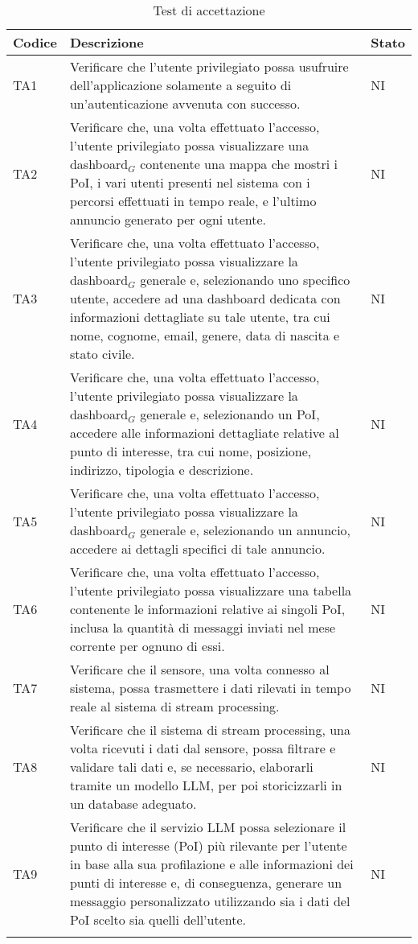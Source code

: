 \documentclass[10pt]{article}
\begin{document}
\begin{justify}
\begin{longtable}{|>{\centering\arraybackslash}m{2cm}|>{\centering\arraybackslash}m{7cm}|>{\centering\arraybackslash}m{2cm}|}
\hline
\textbf{Codice} & \textbf{Descrizione} & \textbf{Stato}\\
\endhead
\hline
TA1 & Verificare che l'utente privilegiato possa usufruire dell'applicazione solamente a seguito di un'autenticazione avvenuta con successo. & NI \\
\hline
TA2 & Verificare che, una volta effettuato l'accesso, l'utente privilegiato possa visualizzare una dashboard$_G$ contenente una mappa che mostri i PoI, i vari utenti presenti nel sistema con i percorsi effettuati in tempo reale, e l'ultimo annuncio generato per ogni utente. & NI \\
\hline
TA3 & Verificare che, una volta effettuato l'accesso, l'utente privilegiato possa visualizzare la dashboard$_G$ generale e, selezionando uno specifico utente, accedere ad una dashboard dedicata con informazioni dettagliate su tale utente, tra cui nome, cognome, email, genere, data di nascita e stato civile. & NI \\
\hline
TA4 & Verificare che, una volta effettuato l'accesso, l'utente privilegiato possa visualizzare la dashboard$_G$ generale e, selezionando un PoI, accedere alle informazioni dettagliate relative al punto di interesse, tra cui nome, posizione, indirizzo, tipologia e descrizione. & NI \\
\hline
TA5 & Verificare che, una volta effettuato l'accesso, l'utente privilegiato possa visualizzare la dashboard$_G$ generale e, selezionando un annuncio, accedere ai dettagli specifici di tale annuncio. & NI \\
\hline
TA6 & Verificare che, una volta effettuato l'accesso, l'utente privilegiato possa visualizzare una tabella contenente le informazioni relative ai singoli PoI, inclusa la quantità di messaggi inviati nel mese corrente per ognuno di essi. & NI \\
\hline
TA7 & Verificare che il sensore, una volta connesso al sistema, possa trasmettere i dati rilevati in tempo reale al sistema di stream processing. & NI \\
\hline
TA8 & Verificare che il sistema di stream processing, una volta ricevuti i dati dal sensore, possa filtrare e validare tali dati e, se necessario, elaborarli tramite un modello LLM, per poi storicizzarli in un database adeguato. & NI \\
\hline
TA9 & Verificare che il servizio LLM possa selezionare il punto di interesse (PoI) più rilevante per l'utente in base alla sua profilazione e alle informazioni dei punti di interesse e, di conseguenza, generare un messaggio personalizzato utilizzando sia i dati del PoI scelto sia quelli dell'utente. & NI \\
\hline
\caption{Test di accettazione}\\
\end{longtable}



\end{justify}
\end{document}
